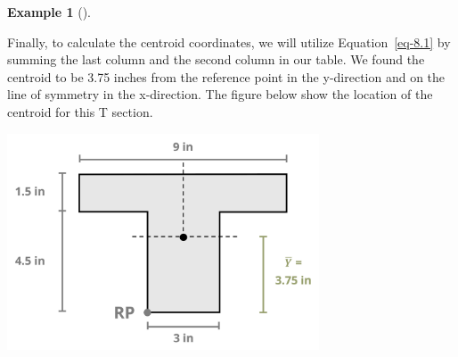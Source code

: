 \documentclass[
  letterpaper,
  DIV=11,
  numbers=noendperiod]{scrreprt}
\theoremstyle{definition}
\newtheorem{example}{Example}[chapter]
\theoremstyle{remark}
\begin{document}
\begin{tcolorbox}
\begin{example}[]
\begin{tcolorbox}
Finally, to calculate the centroid coordinates, we will utilize
Equation~\ref{eq-8.1} by summing the last column and the second column
in our table. We found the centroid to be 3.75 inches from the reference
point in the y-direction and on the line of symmetry in the x-direction.
The figure below show the location of the centroid for this T section.

\begin{center}
\includegraphics[width=3.64583in,height=\textheight]{images/CH 8 PNGs/example 8.1 part 4.png}
\end{center}

\end{tcolorbox}

\end{example}

\end{tcolorbox}
\end{document}
